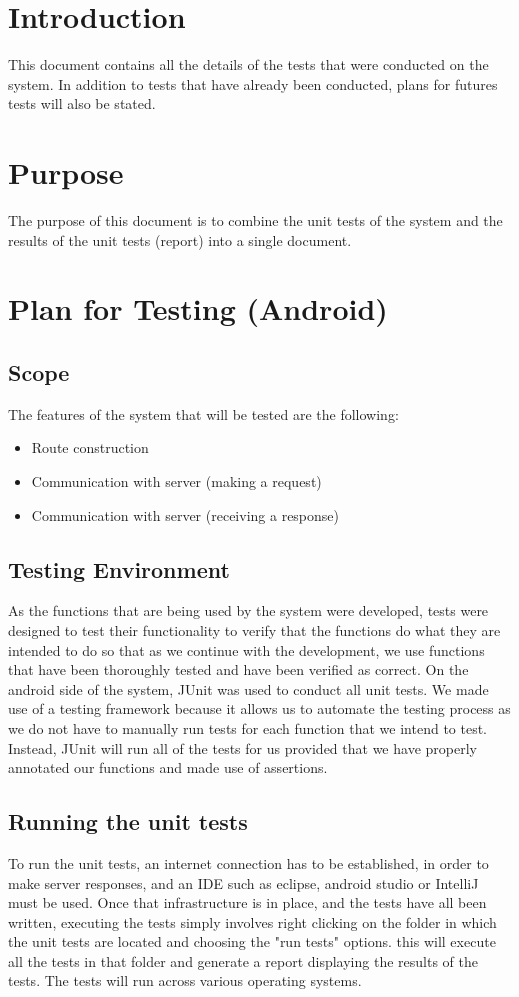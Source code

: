 \documentclass[a4paper,12pt]{article}
\begin{document}
\section{Introduction}
This document contains all the details of the tests that were conducted on the system. In addition to tests that have already been conducted, plans for futures tests will also be stated.

\section{Purpose}
The purpose of this document is to combine the unit tests of the system and the results of the unit tests (report) into a single document.

\section{Plan for Testing (Android)}
\subsection{Scope}
The features of the system that will be tested are the following:
\begin{itemize}
    \item Route construction
    \item Communication with server (making a request)
    \item Communication with server (receiving a response)
\end{itemize}
\subsection{Testing Environment}
As the functions that are being used by the system were developed, tests were designed to test their functionality to verify that the functions do what they are intended to do so that as we continue with the development, we use functions that have been thoroughly tested and have been verified as correct.
On the android side of the system, JUnit was used to conduct all unit tests. We
made use of a testing framework because it allows us to automate the testing process as we do not have to manually run tests for each function that we intend to test. Instead, JUnit will run all of the tests for us provided that we
have properly annotated our functions and made use of assertions.
\subsection{Running the unit tests}
To run the unit tests, an internet connection has to be established, in order to make server responses, and an IDE such as eclipse, android studio or IntelliJ must be used. Once that infrastructure is in place, and the tests have all been written, executing the tests simply involves right clicking on the folder in which the unit tests are located and choosing the "run tests" options. this will execute all the tests in that folder and generate a report displaying the results of the tests. The tests will run across various operating systems.
\end{document}
